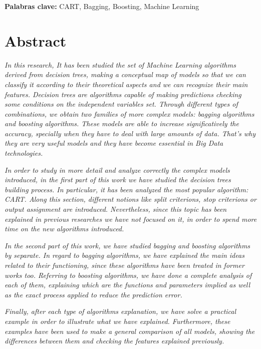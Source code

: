 \documentclass[12pt,twoside]{article}
\begin{document}
\textbf{Palabras clave:} CART, Bagging, Boosting, Machine Learning



\newpage



\section*{Abstract}

\emph{In this research, It has been studied the set of Machine Learning algorithms derived from decision trees, making a conceptual map of models so that we can classify it according to their theoretical aspects and we can recognize their main features. Decision trees are algorithms capable of making predictions checking some conditions on the independent variables set. Through different types of combinations, we obtain two families of more complex models: bagging algorithms and boosting algorithms. These models are able to increase significatively the accuracy, specially when they have to deal with large amounts of data. That's why they are very useful models and they have become essential in Big Data technologies.}

\emph{In order to study in more detail and analyze correctly the complex models introduced, in the first part of this work we have studied the decision trees building process. In particular, it has been analyzed the most popular algorithm: CART. Along this section, different notions like split criterions, stop criterions or output assignment are introduced. Nevertheless, since this topic has been explained in previous researches we have not focused on it, in order to spend more time on the new algorithms introduced.}

\emph{In the second part of this work, we have studied bagging and boosting algorithms by separate. In regard to bagging algorithms, we have explained the main ideas related to their functioning, since these algorithms have been treated in former works too. Referring to boosting algorithms, we have done a complete analysis of each of them, explaining which are the functions and parameters implied as well as the exact process applied to reduce the prediction error.}

\emph{Finally, after each type of algorithms explanation, we have solve a practical example in order to illustrate what we have explained. Furthermore, these examples have been used to make a general comparison of all models, showing the differences between them and checking the features explained previously.}
\end{document}
